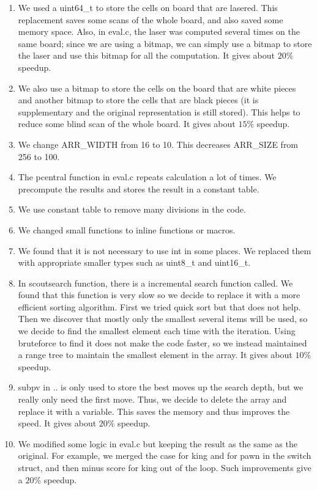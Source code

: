 \documentclass[10pt,twosidep]{article}
\begin{document}
\begin{enumerate}
	\item We used a uint64\_t to store the cells on board that are lasered. This replacement saves some scans of the whole board, and also saved some memory space. Also, in eval.c, the laser was computed several times on the same board; since we are using a bitmap, we can simply use a bitmap to store the laser and use this bitmap for all the computation. It gives about $20\%$ speedup. 
	
		\item We also use a bitmap to store the cells on the board that are white pieces and another bitmap to store the cells that are black pieces (it is supplementary and the original representation is still stored). This helps to reduce some blind scan of the whole board.  It gives about $15\%$ speedup. 


	\item We change ARR\_WIDTH from 16 to 10. This decreases ARR\_SIZE from 256 to 100. 
	\item The pcentral function in eval.c repeats calculation a lot of times. We precompute the results and stores the result in a constant table.
	\item We use constant table to remove many divisions in the code.
	\item We changed small functions to inline functions or macros.
	\item We found that it is not necessary to use int in some places. We replaced them with appropriate smaller types such as uint8\_t and uint16\_t.
		
	
	\item In scoutsearch function, there is a incremental search function called. We found that this function is very slow so we decide to replace it with a more efficient sorting algorithm. First we tried quick sort but that does not help. Then we discover that mostly only the smallest several items will be used, so we decide to find the smallest element each time with the iteration. Using bruteforce to find it does not make the code faster, so we instead maintained a range tree to maintain the smallest element in the array. It gives about $10\%$ speedup. 
	
	\item subpv in .. is only used to store the best moves up the search depth, but we really only need the first move. Thus, we decide to delete the array and replace it with a variable. This saves the memory and thus improves the speed. It gives about $20\%$ speedup. 
	
	\item We modified some logic in eval.c but keeping the result as the same as the original. For example, we merged the case for king and for pawn in the switch struct, and then minus score for king out of the loop. Such improvements give a $20\%$ speedup. 
	
\end{enumerate}
\end{document}
